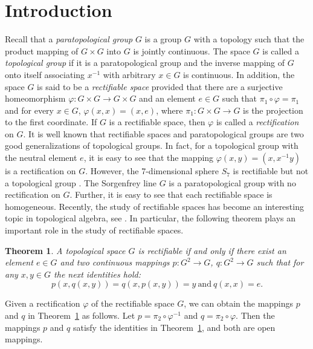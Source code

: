 \documentclass[psamsfonts,fceqn,leqno]{amsart}
\newtheorem{theorem}{Theorem}[section]
\theoremstyle{definition}
\begin{document}
\section{Introduction}
Recall that a {\it paratopological group} $G$ is a group $G$ with a
 topology such that the product mapping of $G \times G$ into
$G$ is jointly continuous. The space $G$ is called a {\it topological group} if it is a paratopological group and the inverse mapping of $G$ onto itself
associating $x^{-1}$ with arbitrary $x\in G$ is continuous. In addition,
the space $G$ is said to be a {\it rectifiable space}
provided that there are a surjective homeomorphism $\varphi :G\times
G\rightarrow G\times G$ and an element $e\in G$ such that
$\pi_{1}\circ \varphi =\pi_{1}$ and for every $x\in G$,
$\varphi (x, x)=(x, e)$, where $\pi_{1}: G\times G\rightarrow G$ is
the projection to the first coordinate. If $G$ is a rectifiable
space, then $\varphi$ is called a {\it rectification} on $G$. It is
well known that rectifiable spaces and paratopological groups are
two good generalizations of topological groups. In fact, for a
topological group with the neutral element $e$, it is easy to
see that the mapping $\varphi (x, y)=(x, x^{-1}y)$ is a rectification on
$G$. However, the 7-dimensional sphere $S_{7}$ is
rectifiable but not a topological group \cite[$\S$ 3]{V1990}. The Sorgenfrey line $G$ is a paratopological group with no rectification on $G$.
Further, it is easy to see that
each rectifiable space is homogeneous. Recently, the study of rectifiable spaces has become an interesting topic in topological algebra, see \cite{A20092, A2009, G1996, HK, LF4, LF3, LF2, LF1, LLL}. In particular,
the following theorem plays an important role in the study of rectifiable spaces.

\begin{theorem}\cite{C1992, G1996, V1989}\label{t4}
A topological space $G$ is rectifiable if and only if there exist an element $e\in G$ and two
continuous mappings $p: G^{2}\rightarrow G$, $q: G^{2}\rightarrow G$
such that for any $x, y\in G$ the next
identities hold:
\smallskip
$$p(x, q(x, y))=q(x, p(x, y))=y\ \mbox{and}\ q(x, x)=e.$$
\end{theorem}

Given a rectification $\varphi$ of the rectifiable space $G$, we can obtain the mappings $p$ and $q$ in Theorem~\ref{t4} as follows. Let $p=\pi_{2}\circ\varphi^{-1}$ and
$q=\pi_{2}\circ\varphi$. Then the mappings $p$ and $q$ satisfy the identities in
Theorem~\ref{t4}, and both are open mappings.
\end{document}
